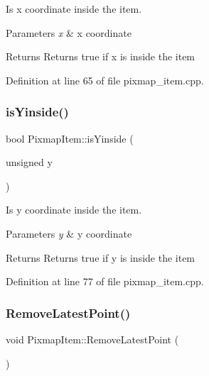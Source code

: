 Is x coordinate inside the item. 


\begin{DoxyParams}{Parameters}
{\em x} & x coordinate \\
\hline
\end{DoxyParams}
\begin{DoxyReturn}{Returns}
Returns true if x is inside the item 
\end{DoxyReturn}


Definition at line 65 of file pixmap\+\_\+item.\+cpp.

\mbox{\label{classPixmapItem_ab6e6526fd5cd0ce5ba34b665adca6c5c}} 
\subsubsection{\texorpdfstring{is\+Yinside()}{isYinside()}}
{\footnotesize\ttfamily bool Pixmap\+Item\+::is\+Yinside (\begin{DoxyParamCaption}\item[{unsigned}]{y }\end{DoxyParamCaption})}



Is y coordinate inside the item. 


\begin{DoxyParams}{Parameters}
{\em y} & y coordinate \\
\hline
\end{DoxyParams}
\begin{DoxyReturn}{Returns}
Returns true if y is inside the item 
\end{DoxyReturn}


Definition at line 77 of file pixmap\+\_\+item.\+cpp.

\mbox{\label{classPixmapItem_ae2e67a7b69ef10dc613e14c1d3c1a327}} 
\subsubsection{\texorpdfstring{Remove\+Latest\+Point()}{RemoveLatestPoint()}}
{\footnotesize\ttfamily void Pixmap\+Item\+::\+Remove\+Latest\+Point (\begin{DoxyParamCaption}{ }\end{DoxyParamCaption})}



